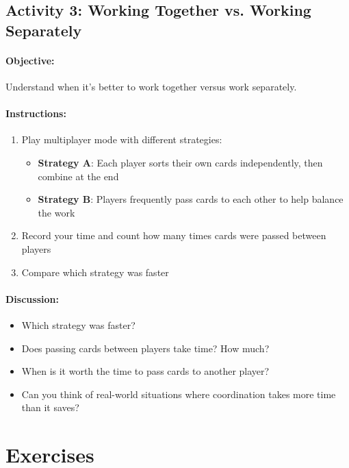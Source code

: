 \subsection{Activity 3: Working Together vs. Working Separately}

\paragraph{Objective:} Understand when it's better to work together versus work separately.

\paragraph{Instructions:}
\begin{enumerate}
    \item Play multiplayer mode with different strategies:
          \begin{itemize}
              \item \textbf{Strategy A}: Each player sorts their own cards independently, then combine at the end
              \item \textbf{Strategy B}: Players frequently pass cards to each other to help balance the work
          \end{itemize}
    \item Record your time and count how many times cards were passed between players
    \item Compare which strategy was faster
\end{enumerate}

\paragraph{Discussion:}
\begin{itemize}
    \item Which strategy was faster?
    \item Does passing cards between players take time? How much?
    \item When is it worth the time to pass cards to another player?
    \item Can you think of real-world situations where coordination takes more time than it saves?
\end{itemize}

\section{Exercises}
\label{app:d:exercises}

